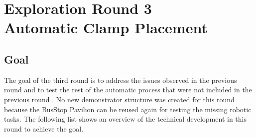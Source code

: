 \chapter[Exploration Round 3 - Automatic Clamp Placement]{Exploration Round 3\\Automatic Clamp Placement}
\label{chapter:exploration-round-3}

\section{Goal}
\label{section:exploration-3-goal}

The goal of the third round is to address the issues observed in the previous round and to test the rest of the automatic process that were not included in the previous round . No new demonstrator structure was created for this round because the BusStop Pavilion can be reused again for testing the missing robotic tasks. The following list shows an overview of the technical development in this round to achieve the goal. 

